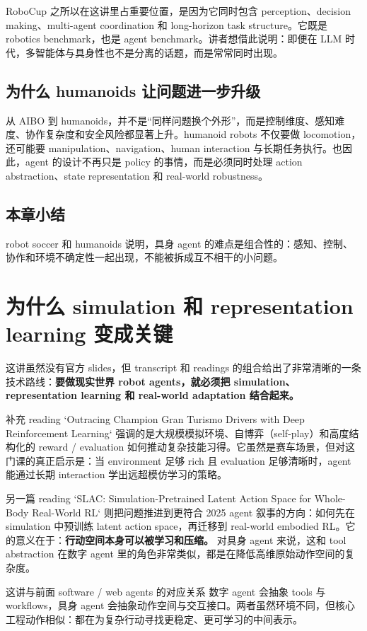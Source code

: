 \documentclass[a4paper]{article}
\begin{document}
RoboCup 之所以在这讲里占重要位置，是因为它同时包含 perception、decision making、multi-agent coordination 和 long-horizon task structure。它既是 robotics benchmark，也是 agent benchmark。讲者想借此说明：即便在 LLM 时代，多智能体与具身性也不是分离的话题，而是常常同时出现。

\subsection{为什么 humanoids 让问题进一步升级}
从 AIBO 到 humanoids，并不是“同样问题换个外形”，而是控制维度、感知难度、协作复杂度和安全风险都显著上升。humanoid robots 不仅要做 locomotion，还可能要 manipulation、navigation、human interaction 与长期任务执行。也因此，agent 的设计不再只是 policy 的事情，而是必须同时处理 action abstraction、state representation 和 real-world robustness。

\subsection{本章小结}
robot soccer 和 humanoids 说明，具身 agent 的难点是组合性的：感知、控制、协作和环境不确定性一起出现，不能被拆成互不相干的小问题。

\section{为什么 simulation 和 representation learning 变成关键}
这讲虽然没有官方 slides，但 transcript 和 readings 的组合给出了非常清晰的一条技术路线：\textbf{要做现实世界 robot agents，就必须把 simulation、representation learning 和 real-world adaptation 结合起来。}

补充 reading `Outracing Champion Gran Turismo Drivers with Deep Reinforcement Learning` 强调的是大规模模拟环境、自博弈（self-play）和高度结构化的 reward / evaluation 如何推动复杂技能习得。它虽然是赛车场景，但对这门课的真正启示是：当 environment 足够 rich 且 evaluation 足够清晰时，agent 能通过长期 interaction 学出远超模仿学习的策略。

另一篇 reading `SLAC: Simulation-Pretrained Latent Action Space for Whole-Body Real-World RL` 则把问题推进到更符合 2025 agent 叙事的方向：如何先在 simulation 中预训练 latent action space，再迁移到 real-world embodied RL。它的意义在于：\textbf{行动空间本身可以被学习和压缩。} 对具身 agent 来说，这和 tool abstraction 在数字 agent 里的角色非常类似，都是在降低高维原始动作空间的复杂度。

\begin{importantbox}{这讲与前面 software / web agents 的对应关系}
数字 agent 会抽象 tools 与 workflows，具身 agent 会抽象动作空间与交互接口。两者虽然环境不同，但核心工程动作相似：都在为复杂行动寻找更稳定、更可学习的中间表示。
\end{importantbox}
\end{document}
